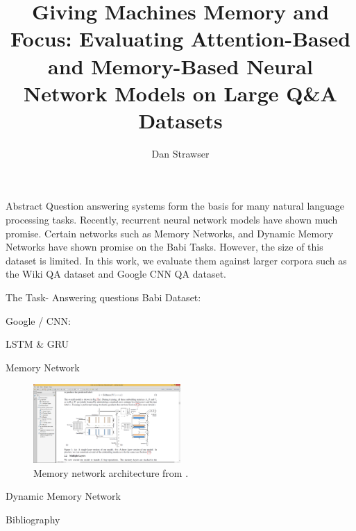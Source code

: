 \documentclass{beamer}
\title[Crisis]{Giving Machines Memory and Focus: Evaluating Attention-Based and Memory-Based Neural Network Models on Large Q\&A Datasets}
\author{Dan Strawser}
\begin{document}
\frame{\titlepage}

\begin{frame}{Abstract}
Question answering systems form the basis for many natural language processing tasks.  Recently, recurrent neural network models have shown much promise.  Certain networks such as Memory Networks, and Dynamic Memory Networks have shown promise on the Babi Tasks. However, the size of this dataset is limited.  In this work, we evaluate them against larger corpora such as the Wiki QA dataset and Google CNN QA dataset.  
\end{frame}

\begin{frame}{The Task- Answering questions}
Babi Dataset:
\vspace{.1 cm}
 \par

Google / CNN:

\end{frame}

\begin{frame}{LSTM \& GRU}


\end{frame}



\begin{frame}{Memory Network}
\begin{figure}[!ht]
  \caption{Memory network architecture from .}
  \centering
    \includegraphics[width=0.5\textwidth]{images/MemoryNetwork}
\end{figure}

\end{frame}


\begin{frame}{Dynamic Memory Network}




\end{frame}




\begin{frame}{Bibliography}

\nocite{*}



\end{frame}
\end{document}
